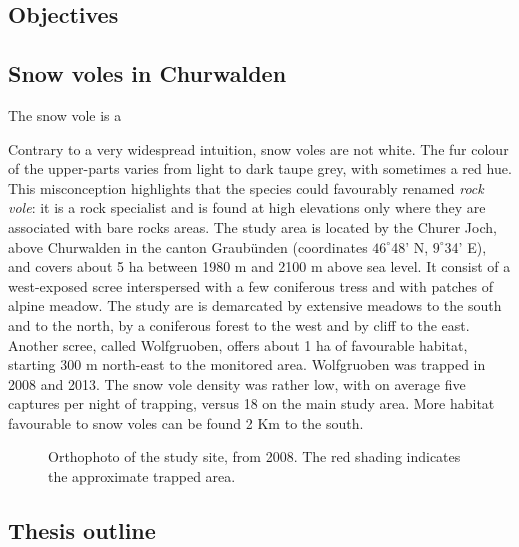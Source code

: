\subsection{Objectives}




\subsection{Snow voles in Churwalden}

The snow vole is a 

Contrary to a very widespread intuition, snow voles are not white. The fur colour of the upper-parts varies from light to dark taupe grey, with sometimes a red hue. This misconception highlights that the species could favourably renamed \emph{rock vole}: it is a rock specialist and is found at high elevations only where they are associated with bare rocks areas. 
The study area is located by the Churer Joch, above Churwalden in the canton Graub\"unden (coordinates $46^{\circ}$48' N, $9^{\circ}$34' E), and covers about 5 ha between 1980 m and 2100 m above sea level. It consist of a west-exposed scree interspersed with a few coniferous tress and with patches of alpine meadow. The study are is demarcated by extensive meadows to the south and to the north, by a coniferous forest to the west and by cliff to the east. Another scree, called Wolfgruoben, offers about 1 ha of favourable habitat, starting 300 m north-east to the monitored area. Wolfgruoben was trapped in 2008 and 2013. The snow vole density was rather low, with on average five captures per night of trapping, versus 18 on the main study area. More habitat favourable to snow voles can be found 2 Km to the south. 


\begin{figure}[ht]
	\caption{Orthophoto of the study site, from 2008. The red shading indicates the approximate trapped area.}
	\label{fig:fieldarea}
\end{figure}


\subsection{Thesis outline}

\printbibliography[heading=subbibliography]

